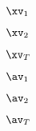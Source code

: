 \documentclass{ctexart}
\begin{document}
$\xv_1$

$\xv_2$

$\xv_T$

$\av_1$

$\av_2$

$\av_T$
\end{document}

